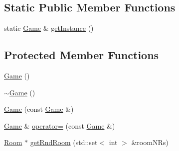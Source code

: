 \subsection*{\-Static \-Public \-Member \-Functions}
\begin{DoxyCompactItemize}
\item 
static \hyperlink{classGame}{\-Game} \& \hyperlink{classGame_ab5b377b52d78849aed162538121a20a0}{get\-Instance} ()
\end{DoxyCompactItemize}
\subsection*{\-Protected \-Member \-Functions}
\begin{DoxyCompactItemize}
\item 
\hyperlink{classGame_ad59df6562a58a614fda24622d3715b65}{\-Game} ()
\item 
\hyperlink{classGame_ae3d112ca6e0e55150d2fdbc704474530}{$\sim$\-Game} ()
\item 
\hyperlink{classGame_aa79443880de5f26387c2a1c70c8c1aae}{\-Game} (const \hyperlink{classGame}{\-Game} \&)
\item 
\hyperlink{classGame}{\-Game} \& \hyperlink{classGame_a3face37327a3fcbbdb96494d58d85c48}{operator=} (const \hyperlink{classGame}{\-Game} \&)
\item 
\hyperlink{classRoom}{\-Room} $\ast$ \hyperlink{classGame_aa9c0d063672042d5751fb4c904b6a5b3}{get\-Rnd\-Room} (std\-::set$<$ int $>$ \&room\-N\-Rs)
\end{DoxyCompactItemize}
